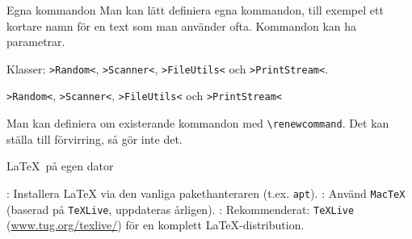 \begin{Slide}{Egna kommandon}
  Man kan lätt definiera egna kommandon, till exempel ett kortare namn
  för en text som man använder ofta. Kommandon kan ha parametrar.

  \vspace{10mm}

  \begin{exlatex}
\newcommand{\scala}[1]
  {\texttt{>{#1}<}}

Klasser: \scala{Random}, \scala{Scanner}, \scala{FileUtils} och \scala{PrintStream}.
  \end{exlatex}

  \texttt{>Random<}, \texttt{>Scanner<}, \texttt{>FileUtils<} och \texttt{>PrintStream<}

  \vspace{5mm}

  Man kan definiera om existerande kommandon med
  \verb+\renewcommand+. Det kan ställa till förvirring, så
  gör inte det.
\end{Slide}

\begin{Slide}{\LaTeX\ på egen dator}\SlideFontSmall
  

  \blankline
  \begin{itemize}
    : {Installera LaTeX via den vanliga pakethanteraren (t.ex. \texttt{apt}).}
    : {Använd \texttt{MacTeX} (baserad på \texttt{TeXLive}, uppdateras årligen).}
    : {Rekommenderat: \texttt{TeXLive} (\url{www.tug.org/texlive/}) för en komplett LaTeX-distribution.}
  \end{itemize}
  
  \halfblankline
  \begin{itemize}
  \end{itemize}

\end{Slide}
